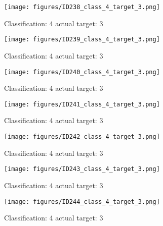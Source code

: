 \begin{figure}[h!]
\begin{center}
\texttt{[image: figures/ID238\_class\_4\_target\_3.png]}
\end{center}
\caption{ Classification: 4 actual target: 3}
\label{fig:ID238_class_4_target_3}
\end{figure}
\begin{figure}[h!]
\begin{center}
\texttt{[image: figures/ID239\_class\_4\_target\_3.png]}
\end{center}
\caption{ Classification: 4 actual target: 3}
\label{fig:ID239_class_4_target_3}
\end{figure}
\begin{figure}[h!]
\begin{center}
\texttt{[image: figures/ID240\_class\_4\_target\_3.png]}
\end{center}
\caption{ Classification: 4 actual target: 3}
\label{fig:ID240_class_4_target_3}
\end{figure}
\begin{figure}[h!]
\begin{center}
\texttt{[image: figures/ID241\_class\_4\_target\_3.png]}
\end{center}
\caption{ Classification: 4 actual target: 3}
\label{fig:ID241_class_4_target_3}
\end{figure}
\begin{figure}[h!]
\begin{center}
\texttt{[image: figures/ID242\_class\_4\_target\_3.png]}
\end{center}
\caption{ Classification: 4 actual target: 3}
\label{fig:ID242_class_4_target_3}
\end{figure}
\begin{figure}[h!]
\begin{center}
\texttt{[image: figures/ID243\_class\_4\_target\_3.png]}
\end{center}
\caption{ Classification: 4 actual target: 3}
\label{fig:ID243_class_4_target_3}
\end{figure}
\begin{figure}[h!]
\begin{center}
\texttt{[image: figures/ID244\_class\_4\_target\_3.png]}
\end{center}
\caption{ Classification: 4 actual target: 3}
\label{fig:ID244_class_4_target_3}
\end{figure}

